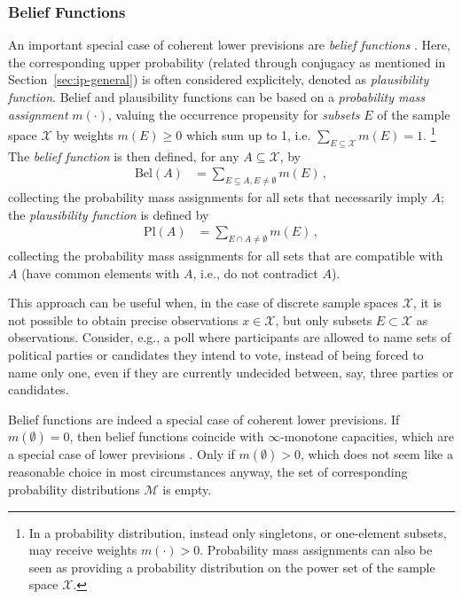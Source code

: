 \subsubsection{Belief Functions}

An important special case of coherent lower previsions %
are \emph{belief functions} \parencite[see, e.g.,][\S 2]{itip-other}.
Here, the corresponding upper probability (related through conjugacy as mentioned in Section~\ref{sec:ip-general})
is often considered explicitely, denoted as \emph{plausibility function}.
Belief and plausibility functions can be based on a \emph{probability mass assignment} $m(\cdot)$,
valuing the occurrence propensity for \emph{subsets} $E$ of the sample space $\mathcal{X}$
by weights $m(E) \ge 0$ which sum up to 1, i.e. $\sum_{E \subseteq \mathcal{X}} m(E) = 1$.%
\footnote{In a probability distribution, instead only singletons,
or one-element subsets, may receive weights $m(\cdot) > 0$.
Probability mass assignments can also be seen as providing a probability distribution on the
power set of the sample space $\mathcal{X}$.}
The \emph{belief function} is then defined, for any $A \subseteq \mathcal{X}$, by
\begin{align*}
\text{Bel}(A) &= \sum_{E \subseteq A, E \neq \emptyset} m(E)\,,
\end{align*}
collecting the probability mass assignments for all sets that necessarily imply $A$;
the \emph{plausibility function} is defined by
\begin{align*}
\text{Pl}(A) &= \sum_{E \cap A \neq \emptyset} m(E)\,,
\end{align*}
collecting the probability mass assignments for all sets that are compatible with $A$
(have common elements with $A$, i.e., do not contradict $A$).

This approach can be useful when,
in the case of discrete sample spaces $\mathcal{X}$,
it is not possible to obtain
precise observations $x \in \mathcal{X}$,
but only subsets $E \subset \mathcal{X}$ as observations.
Consider, e.g., a poll where participants 
are allowed to name sets of political parties or candidates they intend to vote,
instead of being forced to name only one, even if they are currently undecided between, say, three parties or candidates.

Belief functions are indeed a special case of coherent lower previsions.
If $m(\emptyset) = 0$, then belief functions coincide with $\infty$-monotone capacities,
which are a special case of lower previsions \parencite[e.g.,][\S 2.1]{itip-other}.
Only if $m(\emptyset) > 0$, which does not seem like a reasonable choice in most circumstances anyway,
the set of corresponding probability distributions $\mathcal{M}$ is empty.


